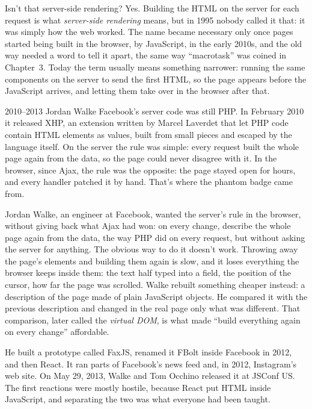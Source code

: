 \begin{question}{Isn't that server-side rendering?}
Yes. Building the HTML on the server for each request is what
\emph{server-side rendering} means, but in 1995 nobody called it that: it was
simply how the web worked. The name became necessary only once pages started
being built in the browser, by JavaScript, in the early 2010s, and the old way
needed a word to tell it apart, the same way ``macrotask'' was coined in
Chapter~3. Today the term usually means something narrower: running the same
components on the server to send the first HTML, so the page appears before the
JavaScript arrives, and letting them take over in the browser after that.
\end{question}

\begin{history}{2010--2013 \textperiodcentered{} Jordan Walke}
Facebook's server code was still PHP. In February 2010 it released XHP, an
extension written by Marcel Laverdet that let PHP code contain HTML elements as
values, built from small pieces and escaped by the language itself. On the
server the rule was simple: every request built the whole page again from the
data, so the page could never disagree with it. In the browser, since Ajax, the
rule was the opposite: the page stayed open for hours, and every handler
patched it by hand. That's where the phantom badge came from.

Jordan Walke, an engineer at Facebook, wanted the server's rule in the browser,
without giving back what Ajax had won: on every change, describe the whole page
again from the data, the way PHP did on every request, but without asking the
server for anything. The obvious way to do it doesn't work. Throwing away the
page's elements and building them again is slow, and it loses everything the
browser keeps inside them: the text half typed into a field, the position of
the cursor, how far the page was scrolled. Walke rebuilt something cheaper
instead: a description of the page made of plain JavaScript objects. He
compared it with the previous description and changed in the real page only
what was different. That comparison, later called the \emph{virtual DOM}, is
what made ``build everything again on every change'' affordable.

He built a prototype called FaxJS, renamed it
FBolt inside Facebook in 2012, and then React. It ran parts of Facebook's news
feed and, in 2012, Instagram's web site. On May 29, 2013, Walke and Tom
Occhino released it at JSConf US. The first reactions were mostly hostile,
because React put HTML inside JavaScript, and separating the two was what
everyone had been taught.
\end{history}

